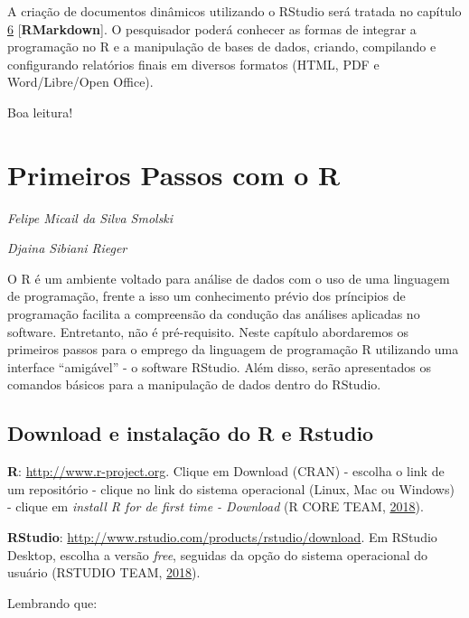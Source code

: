 \documentclass[12pt,brazil,oneside]{book}
\begin{document}
A criação de documentos dinâmicos utilizando o RStudio será tratada no capítulo \protect\hyperlink{rmark}{6} {[}\textbf{RMarkdown}{]}. O pesquisador poderá conhecer as formas de integrar a programação no R e a manipulação de bases de dados, criando, compilando e configurando relatórios finais em diversos formatos (HTML, PDF e Word/Libre/Open Office).

Boa leitura!

\hypertarget{intro}{%
\chapter{Primeiros Passos com o R}\label{intro}}

\emph{Felipe Micail da Silva Smolski}

\emph{Djaina Sibiani Rieger}

\begin{flushright}
\emph{}

\emph{}
\end{flushright}

O R é um ambiente voltado para análise de dados com o uso de uma linguagem de programação, frente a isso um conhecimento prévio dos príncipios de programação facilita a compreensão da condução das análises aplicadas no software. Entretanto, não é pré-requisito. Neste capítulo abordaremos os primeiros passos para o emprego da linguagem de programação R utilizando uma interface ``amigável'' - o software RStudio. Além disso, serão apresentados os comandos básicos para a manipulação de dados dentro do RStudio.

\hypertarget{download-e-instalacao-do-r-e-rstudio}{%
\section{Download e instalação do R e Rstudio}\label{download-e-instalacao-do-r-e-rstudio}}

\textbf{R}: \url{http://www.r-project.org}. Clique em Download (CRAN) - escolha o link de um repositório - clique no link do sistema operacional (Linux, Mac ou Windows) - clique em \emph{install R for de first time - Download} (R CORE TEAM, \protect\hyperlink{ref-rcore}{2018}).

\textbf{RStudio}: \url{http://www.rstudio.com/products/rstudio/download}. Em RStudio Desktop, escolha a versão \emph{free}, seguidas da opção do sistema operacional do usuário (RSTUDIO TEAM, \protect\hyperlink{ref-teamrstudio}{2018}).

Lembrando que:
\end{document}
